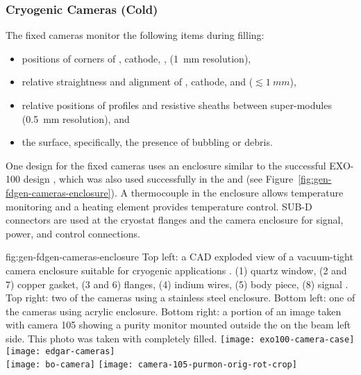 \subsubsection{Cryogenic Cameras (Cold)}

The fixed cameras
monitor the following items during filling:
\begin{itemize}
\item positions of corners of , cathode, ,  (\SI{1}{mm} resolution),
\item relative straightness and alignment of , cathode, and  (\(\lesssim\SI{1}{mm}\)),
\item relative positions of  profiles and resistive sheaths between super-modules (\SI{0.5}{mm} resolution), and 
\item the \lar surface, specifically, the presence of bubbling or debris.
\end{itemize}




One design for the  fixed cameras uses an enclosure similar to
the successful EXO-100 design \cite{Delaquis:2013hva}, which was also
used successfully in the   
and  (see Figure~\ref{fig:gen-fdgen-cameras-enclosure}).
A thermocouple in the enclosure allows temperature monitoring and a heating element provides temperature control.  
SUB-D 
connectors are used at the cryostat flanges and the camera enclosure for signal, power, and control connections.


\begin{dunefigure}{fig:gen-fdgen-cameras-enclosure}
  {Top left: a CAD exploded view of a vacuum-tight camera enclosure suitable for cryogenic applications \cite{Delaquis:2013hva}.
    (1) quartz window, (2 and 7) copper gasket, (3 and 6) flanges, (4) indium wires, (5) body piece, (8) signal \fdth.
    Top right: two of the  cameras using a stainless steel enclosure. 
    Bottom left: one of the  cameras using acrylic enclosure.
    Bottom right: a portion of an image taken with  camera 105 showing a purity monitor mounted outside the  on the beam left side. This photo was taken with  completely filled.
  }
  \texttt{[image: exo100-camera-case]}%
  \texttt{[image: edgar-cameras]}\\
  \hfill \texttt{[image: bo-camera]}%
  \hfill \texttt{[image: camera-105-purmon-orig-rot-crop]}%
  \hfill
\end{dunefigure}


